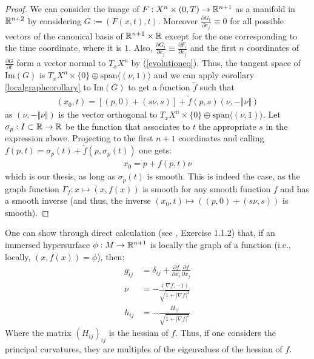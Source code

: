 \begin{proof}
	We can consider the image of $F:X^n\times(0, T)\rightarrow \mathbb{R}^{n+1}$ as a manifold in $\mathbb{R}^{n+2}$ by considering $G:=(F(x, t), t)$. Moreover $\frac{\partial G_t}{\partial e_j}\equiv 0$ for all possible vectors of the canonical basis of $\mathbb{R}^{n+1}\times \mathbb{R}$ except for the one corresponding to the time coordinate, where it is $1$. Also, $\frac{\partial G_i}{\partial e_j}\equiv \frac{\partial F_i}{\partial e_j}$ and the first $n$ coordinates of  $\frac{\partial G}{\partial t}$ form a vector normal to $T_x X^n$ by (\ref{evolutioneq}).  Thus, the tangent space of $\mathrm{Im}(G)$ is $T_x X^n \times \{0\}\oplus  \mathrm{span}\langle (\nu, 1)\rangle$ and we can apply corollary  \ref{localgraphcorollary} to $\mathrm{Im}(G)$ to get a function $\tilde{f}$ such that 
	\begin{align*}
		(x_0, t)= \left[(p, 0) +  (s\nu, s)\right] + \tilde{f}(p, s)(\nu, -\Vert \nu\Vert)
	\end{align*}
	as $(\nu, -\Vert \nu\Vert)$ is the vector orthogonal to  $T_x X^n \times \{0\}\oplus  \mathrm{span}\langle (\nu, 1)\rangle$. Let $\sigma_p:I\subset\mathbb{R}\rightarrow\mathbb{R}$ be the function that associates to $t$ the appropriate $s$ in the expression above.  Projecting to the first $n+1$ coordinates and calling $f(p, t)=\sigma_p(t)+\tilde{f}(p, \sigma_p(t))$ one gets:
	\begin{align*}
		x_0= p + f(p, t)\nu 
	\end{align*}
	which is our thesis, as long as $\sigma_p(t)$ is smooth. This is indeed the case, as the graph function $\Gamma_f:x\mapsto(x, f(x))$ is smooth for any smooth function $f$ and has a smooth inverse (and thus, the inverse $(x_0, t)\mapsto ((p, 0) +  (s\nu, s))$ is smooth).
\end{proof}
One can show through direct calculation (see \cite{mantegazza}, Exercise 1.1.2) that, if an immersed hypersurface $\phi : M\rightarrow \mathbb{R}^{n+1}$ is locally the graph of a function (i.e., locally, $(x, f(x))=\phi$), then: 
\begin{align*}
	g_{ij}&=\delta_{ij}+ \frac{\partial f}{\partial x_i} \frac{\partial f}{\partial x_j}\\
	\nu&= -\frac{(\nabla f, -1)}{\sqrt{1+|\nabla f|^2}}\\
	h_{ij}&= -\frac{H_{ij}}{\sqrt{1+|\nabla f|^2}}
\end{align*}
Where the matrix $(H_{ij})_{ij}$ is the hessian of $f$. Thus, if one considers the principal curvatures, they are multiples of the eigenvalues of the hessian of $f$. 




